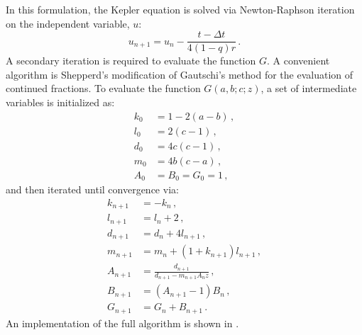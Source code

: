 In this formulation, the Kepler equation is solved via Newton-Raphson iteration on the independent variable, $u$:
\begin{equation}
u_{n+1} = u_n - \frac{t - \Delta t}{4(1 - q) r} \,.
\end{equation}
A secondary iteration is required to evaluate the function $G$.  A convenient algorithm is Shepperd's modification of Gautschi's method for the evaluation of continued fractions.  To evaluate the function $G(a,b;c;z)$, a set of intermediate variables is initialized as:
\begin{align}
k_0 &= 1 - 2(a - b) \,,\\
l_0 &= 2(c-1) \,, \\
d_0 &= 4c(c-1) \,, \\
m_0 &= 4b(c-a) \,, \\
A_0 &= B_0 = G_0 = 1 \,,
\end{align} 
and then iterated until convergence via:
\begin{align}
k_{n+1} &= -k_n \,,\\
l_{n+1} &= l_n + 2 \,, \\
d_{n+1} &= d_n + 4l_{n+1} \,, \\
m_{n+1} &= m_n + (1+k_{n+1})l_{n+1} \,, 
\\
A_{n+1} &= \frac{d_{n+1}}{d_{n+1} - m_{n+1} A_n z} \,,\\
B_{n+1} &= (A_{n+1} - 1)B_n \,,\\
G_{n+1} &= G_n + B_{n+1} \,.
\end{align} 
An implementation of the full algorithm is shown in .

